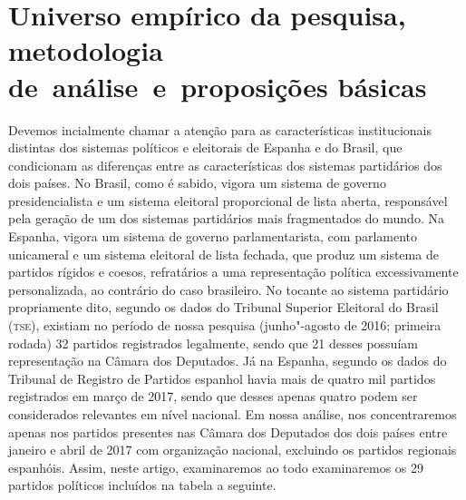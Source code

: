 \section{Universo empírico da pesquisa, metodologia de~análise~e~proposições básicas}

Devemos incialmente chamar a atenção para as características
institucionais distintas dos sistemas políticos e eleitorais de Espanha
e do Brasil, que condicionam as diferenças entre as características dos
sistemas partidários dos dois países. No Brasil, como é sabido, vigora
um sistema de governo presidencialista e um sistema eleitoral
proporcional de lista aberta, responsável pela geração de um dos
sistemas partidários mais fragmentados do mundo. Na Espanha, vigora um
sistema de governo parlamentarista, com parlamento unicameral e um
sistema eleitoral de lista fechada, que produz um sistema de partidos
rígidos e coesos, refratários a uma representação política
excessivamente personalizada, ao contrário do caso brasileiro. No
tocante ao sistema partidário propriamente dito, segundo os dados do
Tribunal Superior Eleitoral do Brasil (\textsc{tse}), existiam no período de
nossa pesquisa (junho"-agosto de 2016; primeira rodada) 32 partidos
registrados legalmente, sendo que 21 desses possuíam representação na
Câmara dos Deputados. Já na Espanha, segundo os dados do Tribunal de
Registro de Partidos espanhol havia mais de quatro mil partidos
registrados em março de 2017, sendo que desses apenas quatro podem ser
considerados relevantes em nível nacional. Em nossa análise, nos
concentraremos apenas nos partidos presentes nas Câmara dos Deputados
dos dois países entre janeiro e abril de 2017 com organização nacional,
excluindo os partidos regionais espanhóis. Assim, neste artigo,
examinaremos ao todo examinaremos os 29 partidos políticos incluídos na
tabela a seguinte.


